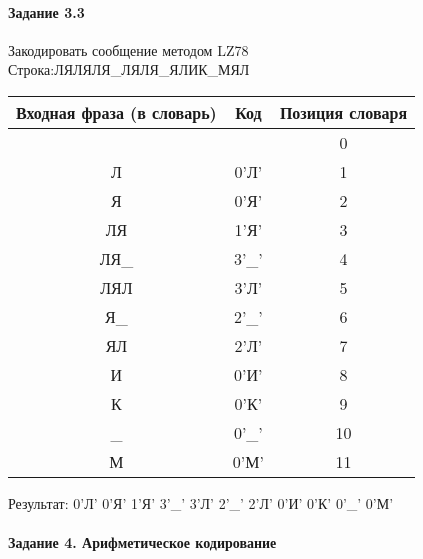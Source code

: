 \documentclass[a4paper, 12pt]{article}
\begin{document}
\paragraph{Задание 3.3}

Закодировать сообщение методом LZ78\\
Строка:ЛЯЛЯЛЯ\_ЛЯЛЯ\_ЯЛИК\_МЯЛ\\
\begin{table}[h!]
\centering
\begin{tabular}{|c|c|c|} 
\hline
 Входная фраза (в словарь) & Код & Позиция словаря \\ \hline

 &  & 0 \\ \hline
Л & 0'Л' & 1 \\ \hline
Я & 0'Я' & 2 \\ \hline
ЛЯ & 1'Я' & 3 \\ \hline
ЛЯ\_ & 3'\_' & 4 \\ \hline
ЛЯЛ & 3'Л' & 5 \\ \hline
Я\_ & 2'\_' & 6 \\ \hline
ЯЛ & 2'Л' & 7 \\ \hline
И & 0'И' & 8 \\ \hline
К & 0'К' & 9 \\ \hline
\_ & 0'\_' & 10 \\ \hline
М & 0'М' & 11 \\ \hline
\end{tabular}
\end{table}

Результат: 0'Л' 0'Я' 1'Я' 3'\_' 3'Л' 2'\_' 2'Л' 0'И' 0'К' 0'\_' 0'М'\\
\pagebreak
\paragraph{Задание 4. Арифметическое кодирование\\}
\end{document}
